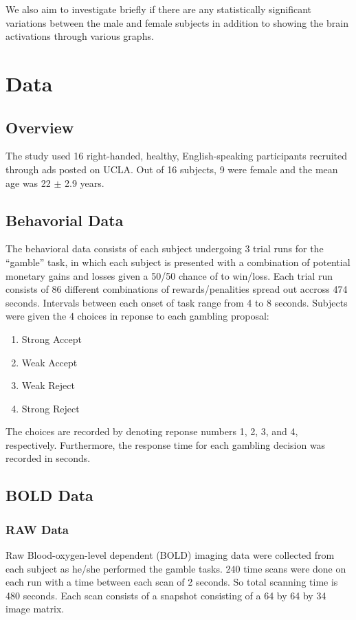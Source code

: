 \documentclass[11pt]{article}
\begin{document}
\par 
We also aim to investigate briefly if there are any statistically significant variations between the male and female subjects in addition to showing the brain activations through various graphs.

\section{Data}
\subsection{Overview}
The study used 16 right-handed, healthy, English-speaking participants 
recruited through ads posted on UCLA. Out of 16 subjects, 9 were female and 
the mean age was 22 $ \pm $ 2.9 years. 

\subsection{Behavorial Data}
The behavioral data consists of each subject undergoing 3 trial runs for the 
``gamble'' task, in which each subject is presented with a combination of 
potential monetary gains and losses given a 50/50 chance of to win/loss. Each 
trial run consists of 86 different combinations of rewards/penalities spread 
out accross 474 seconds. Intervals between each onset of task range from 4 to 
8 seconds. Subjects were given the 4 choices in reponse to each gambling 
proposal:
\begin{enumerate}
  \item Strong Accept
  \item Weak Accept
  \item Weak Reject
  \item Strong Reject
\end{enumerate}
The choices are recorded by denoting reponse numbers 1, 2, 3, and 4, 
respectively. Furthermore, the response time for each gambling decision was 
recorded in seconds. 
\subsection{BOLD Data}
\subsubsection{RAW Data}
Raw Blood-oxygen-level dependent (BOLD) imaging data were collected from each
subject as he/she performed the gamble tasks. 240 time scans were done on each
run with a time between each scan of 2 seconds. So total scanning time is 480
seconds. Each scan consists of a snapshot consisting of a 64 by 64 by 34 image
matrix.
\end{document}
